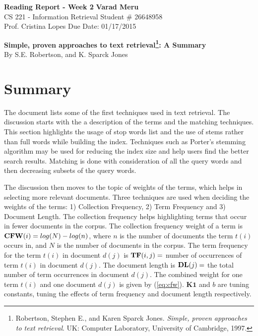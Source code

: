 \documentclass[a4paper, 11pt]{article}
\begin{document}
\begin{noindent}
\large\textbf{Reading Report - Week 2} \hfill \textbf{Varad Meru} \\
\normalsize CS 221 - Information Retrieval \hfill Student \# 26648958 \\
Prof. Cristina Lopes \hfill Due Date: 01/17/2015
\end{noindent}
\noindent\makebox[\linewidth]{\rule{\textwidth}{0.4pt}}

\begin{center}
\textbf{\Large{Simple, proven approaches to text retrieval}\footnote{Robertson, Stephen E., and Karen Sparck Jones. \textit{Simple, proven approaches to text retrieval}. UK: Computer Laboratory, University of Cambridge, 1997.}: A Summary}\\
By S.E. Robertson, and K. Sparck Jones
\end{center}
\vspace{-25pt}
\section*{Summary}
\vspace{-5pt}
The document lists some of the first techniques used in text retrieval. The discussion starts with the a description of the terms and the matching techniques. This section highlights the usage of stop words list and the use of stems rather than full words while building the index. Techniques such as Porter's stemming algorithm may be used for reducing the index size and help users find the better search results. Matching is done with consideration of all the query words and then decreasing subsets of the query words.

The discussion then moves to the topic of weights of the terms, which helps in selecting more relevant documents. Three techniques are used when deciding the weights of the terms: 1) Collection Frequency, 2) Term Frequency and 3) Document Length. The collection frequency helps highlighting terms that occur in fewer documents in the corpus. The collection frequency weight of a term is \( \mathbf{CFW (\mathnormal{i})} = log(N) - log(n)\), where \(n\) is the number of documents the term \(t(i)\) occurs in, and \(N\) is the number of documents in the corpus. The term frequency for the term \(t(i)\) in document \(d(j)\) is \(\mathbf{TF(\mathnormal{i,j})} = \) number of occurrences of term \(t(i)\) in document \(d(j)\). The document length is \(\mathbf{DL(\mathnormal{j})} = \) the total number of term occurrences in document \(d(j)\). The combined weight for one term \(t(i)\) and one document \(d(j)\) is given by (\ref{eq:cfw}). \(\mathbf{K1}\) and \(b\) are tuning constants, tuning the effects of term frequency and document length respectively.
\end{document}
